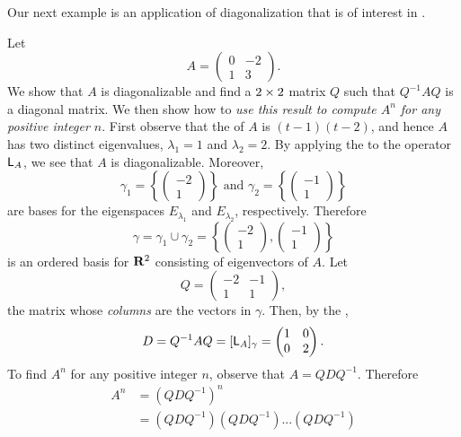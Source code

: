 Our next example is an application of diagonalization that is of interest in .

\begin{example} \label{example 5.2.7}
Let
\[
    A = \begin{pmatrix} 0 & -2 \\ 1 & 3 \end{pmatrix}.
\]
We show that \(A\) is diagonalizable and find a \(2 \times 2\) matrix \(Q\) such that \(Q^{-1} A Q\) is a diagonal matrix.
We then show how to \emph{use this result to compute \(A^{n}\)
for any positive integer \(n\)}.
First observe that the \CPOLY{} of \(A\) is \((t - 1)(t- 2)\), and hence \(A\) has two distinct eigenvalues, \(\lambda_1 = 1\) and \(\lambda_2 = 2\).
By applying the  to the operator \(\textsf{L}_A\), we see that \(A\) is diagonalizable.
Moreover,
\[
    \gamma_1 = \left\{ \begin{pmatrix}
        -2 \\ 1
    \end{pmatrix} \right\}
    \text{ and }
    \gamma_2 = \left\{ \begin{pmatrix}
        -1 \\ 1
    \end{pmatrix} \right\}
\]
are bases for the eigenspaces \(E_{\lambda_1}\) and \(E_{\lambda_2}\), respectively. Therefore
\[
    \gamma = \gamma_1 \cup \gamma_2 = \left\{ \begin{pmatrix}
        -2 \\ 1
    \end{pmatrix}, \begin{pmatrix}
        -1 \\ 1
    \end{pmatrix} \right\}
\]
is an ordered basis for \(\mathbf{R}^2\) consisting of eigenvectors of \(A\).
Let
\[
    Q = \begin{pmatrix}
        -2 & -1 \\ 1 & 1
    \end{pmatrix},
\]
the matrix whose \emph{columns} are the vectors in \(\gamma\).
Then, by the ,
\[
    D = Q^{-1} A Q = [\textsf{L}_A]_{\gamma} = \begin{pmatrix} 1 & 0 \\ 0 & 2 \end{pmatrix}.
\]
To find \(A^n\) for any positive integer \(n\), observe that \(A = QDQ^{-1}\).
Therefore
\begin{align*}
    A^n & = (QDQ^{-1})^n \\
        & = (QDQ^{-1})(QDQ^{-1}) ... (QDQ^{-1}) \\

\end{align*}
\end{example}

